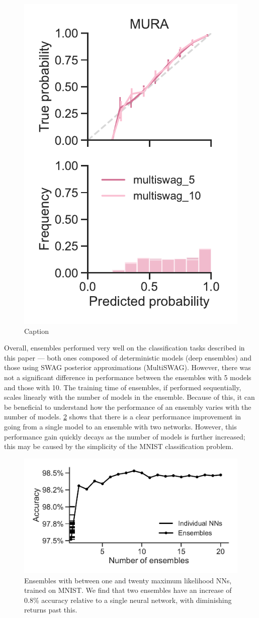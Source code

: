 \documentclass[10pt,a4paper,twocolumn]{article}
\begin{document}
\begin{figure}
    \centering
    \includegraphics[width=0.55\linewidth]{figures/MuraMultiSwag.pdf}
    \caption{Caption}
    \label{fig:mura-cc-multiswag}
\end{figure}


Overall, ensembles performed very well on the classification tasks described in this paper --- both ones composed of deterministic models (deep ensembles) and those using SWAG posterior approximations (MultiSWAG).
However, there was not a significant difference in performance between the ensembles with 5 models and those with 10.
The training time of ensembles, if performed sequentially, scales linearly with the number of models in the ensemble.
Because of this, it can be beneficial to understand how the performance of an ensembly varies with the number of models.
\cref{fig:ensembles} shows that there is a clear performance improvement in going from a single model to an ensemble with two networks.
However, this performance gain quickly decays as the number of models is further increased; this may be caused by the simplicity of the MNIST classification problem.
%
\begin{figure}
    \centering
    \includegraphics[width=\linewidth]{figures/ensemble_comparison.pdf}
    \caption{Ensembles with between one and twenty maximum likelihood NNs, trained on MNIST. We find that two ensembles have an increase of 0.8\% accuracy relative to a single neural network, with diminishing returns past this.}
    \label{fig:ensembles}
\end{figure}
\end{document}
